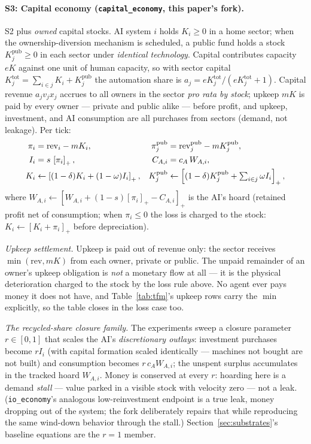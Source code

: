 \documentclass[11pt]{article}
\newcommand{\relu}[1]{\left[#1\right]_+}
\begin{document}
\paragraph{S3: Capital economy (\texttt{capital\_economy}, this paper's
fork).} S2 plus \emph{owned} capital stocks. AI system $i$ holds
$K_i \ge 0$ in a home sector; when the ownership-diversion mechanism is
scheduled, a public fund holds a stock $K^{\mathrm{pub}}_j \ge 0$ in each
sector under \emph{identical technology}. Capital contributes capacity
$e K$ against one unit of human capacity, so with sector capital
$K_j^{\mathrm{tot}} = \sum_{i \in j} K_i + K^{\mathrm{pub}}_j$ the
automation share is $a_j = eK_j^{\mathrm{tot}} / (eK_j^{\mathrm{tot}} + 1)$.
Capital revenue $a_j v_j x_j$ accrues to all owners in the sector
\emph{pro rata by stock}; upkeep $mK$ is paid by every owner --- private and
public alike --- before profit, and upkeep, investment, and AI consumption
are all purchases from sectors (demand, not leakage). Per tick:
\begin{align}
  \pi_i &= \mathrm{rev}_i - m K_i,
  &\pi^{\mathrm{pub}}_j &= \mathrm{rev}^{\mathrm{pub}}_j - m K^{\mathrm{pub}}_j,\notag\\
  I_i &= s\,\relu{\pi_i},
  &C_{A,i} &= c_A\, W_{A,i},\label{eq:flows}\\
  K_i &\leftarrow \relu{(1-\delta)K_i + (1-\omega) I_i},
  &K^{\mathrm{pub}}_j &\leftarrow \relu{(1-\delta)K^{\mathrm{pub}}_j
     + \textstyle\sum_{i\in j}\omega I_i},\label{eq:kupdate}
\end{align}
where $W_{A,i} \leftarrow \relu{W_{A,i} + (1-s)\relu{\pi_i} - C_{A,i}}$ is
the AI's hoard (retained profit net of consumption; when $\pi_i \le 0$ the
loss is charged to the stock: $K_i \leftarrow \relu{K_i + \pi_i}$ before
depreciation).

\emph{Upkeep settlement.} Upkeep is paid out of revenue only: the sector
receives $\min(\mathrm{rev}, mK)$ from each owner, private or public. The
unpaid remainder of an owner's upkeep obligation is \emph{not} a monetary
flow at all --- it is the physical deterioration charged to the stock by the
loss rule above. No agent ever pays money it does not have, and
Table~\ref{tab:tfm}'s upkeep rows carry the $\min$ explicitly, so the table
closes in the loss case too.

\emph{The recycled-share closure family.} The experiments sweep a closure
parameter $r \in [0,1]$ that scales the AI's \emph{discretionary outlays}:
investment purchases become $r I_i$ (with capital formation scaled
identically --- machines not bought are not built) and consumption becomes
$r\, c_A W_{A,i}$; the unspent surplus accumulates in the tracked hoard
$W_{A,i}$. Money is conserved at every $r$: hoarding here is a demand
\emph{stall} --- value parked in a visible stock with velocity zero --- not
a leak. (\texttt{io\_economy}'s analogous low-reinvestment endpoint is a
true leak, money dropping out of the system; the fork deliberately repairs
that while reproducing the same wind-down behavior through the stall.)
Section~\ref{sec:substrates}'s baseline equations are the $r=1$ member.
\end{document}
